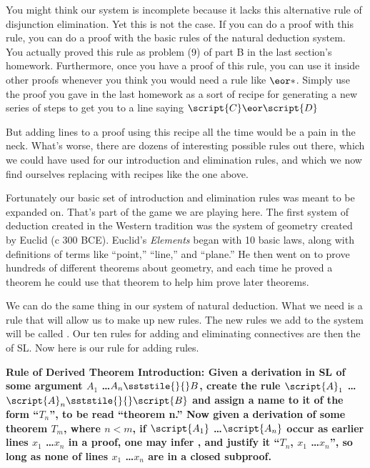 You might think our system is incomplete because it lacks this alternative rule of disjunction elimination. Yet this is not the case. If you can do a proof with this rule, you can do a proof with the basic rules of the natural deduction system. You actually proved this rule as problem (9) of part B in the last section's homework. Furthermore, once you have a proof of this rule, you can use it inside other proofs whenever you think you would need a rule like $\eor \ast$. Simply use the proof you gave in the last homework as a sort of recipe for generating a new series of steps to get you to a line saying $\script{C} \eor \script{D}$

But adding lines to a proof using this recipe all the time would be a pain in the neck. What's worse, there are dozens of interesting possible rules out there, which we could have used for our introduction and elimination rules, and which we now find ourselves replacing with recipes like the one above. 

Fortunately our basic set of introduction and elimination rules was meant to be expanded on. That's part of the game we are playing here. The first system of deduction created in the Western tradition was the system of geometry created by Euclid (c 300 BCE). Euclid's \emph{Elements}  began with 10 basic laws, along with definitions of terms like ``point,'' ``line,'' and ``plane.'' He then went on to prove hundreds of different theorems about geometry, and each time he proved a theorem he could use that theorem to help him prove later theorems. 

We can do the same thing in our system of natural deduction. What we need is a rule that will allow us to make up new rules. The new rules we add to the system will be called . Our ten rules for adding and eliminating connectives are then the  of SL. Now here is our rule for adding rules. 

{\narrower \narrower
 
\bf{Rule of Derived Theorem Introduction:} \rm Given a derivation in SL of some argument $A_1$ \ldots $A_n \sststile{}{} B$, create the rule $\script{A}_1$ \ldots $\script{A}_n \sststile{}{} \script{B}$ and assign a name to it of the form ``$T_n$'', to be read ``theorem n.'' Now given a derivation of some theorem $T_m$, where $n < m$, if $\script{A_1}$ \ldots $\script{A_n}$ occur as earlier lines $x_1$ \ldots $x_n$ in a proof, one may infer , and justify it ``$T_n$, $x_1$ \ldots $x_n$'', so long as none of lines $x_1$ \ldots $x_n$ are in a closed subproof.
\par
}


